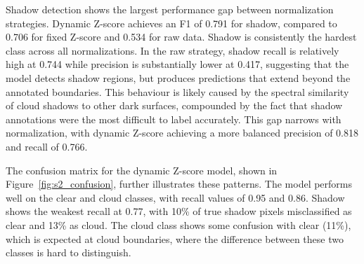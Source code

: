 Shadow detection shows the largest performance gap between normalization strategies. Dynamic Z-score achieves an F1 of 0.791 for shadow, compared to 0.706 for fixed Z-score and 0.534 for raw data. Shadow is consistently the hardest class across all normalizations. In the raw strategy, shadow recall is relatively high at 0.744 while precision is substantially lower at 0.417, suggesting that the model detects shadow regions, but produces predictions that extend beyond the annotated boundaries. This behaviour is likely caused by the spectral similarity of cloud shadows to other dark surfaces, compounded by the fact that shadow annotations were the most difficult to label accurately. This gap narrows with normalization, with dynamic Z-score achieving a more balanced precision of 0.818 and recall of 0.766.

The confusion matrix for the dynamic Z-score model, shown in 
Figure~\ref{fig:s2_confusion}, further illustrates these patterns. The model performs well on the clear and cloud classes, with recall values of 0.95 and 0.86. Shadow shows the weakest recall at 0.77, with 10\% of true shadow pixels misclassified as clear and 13\% as cloud. The cloud class shows some confusion with clear (11\%), which is expected at cloud boundaries, where the difference between these two classes is hard to distinguish. 

